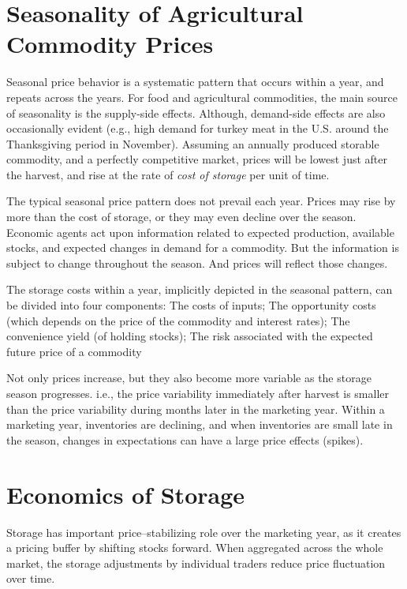 \documentclass[]{book}
\begin{document}
\section{Seasonality of Agricultural Commodity
Prices}\label{seasonality-of-agricultural-commodity-prices}

Seasonal price behavior is a systematic pattern that occurs within a
year, and repeats across the years. For food and agricultural
commodities, the main source of seasonality is the supply-side effects.
Although, demand-side effects are also occasionally evident (e.g., high
demand for turkey meat in the U.S. around the Thanksgiving period in
November). Assuming an annually produced storable commodity, and a
perfectly competitive market, prices will be lowest just after the
harvest, and rise at the rate of \emph{cost of storage} per unit of
time.

The typical seasonal price pattern does not prevail each year. Prices
may rise by more than the cost of storage, or they may even decline over
the season. Economic agents act upon information related to expected
production, available stocks, and expected changes in demand for a
commodity. But the information is subject to change throughout the
season. And prices will reflect those changes.

The storage costs within a year, implicitly depicted in the seasonal
pattern, can be divided into four components: The costs of inputs; The
opportunity costs (which depends on the price of the commodity and
interest rates); The convenience yield (of holding stocks); The risk
associated with the expected future price of a commodity

Not only prices increase, but they also become more variable as the
storage season progresses. i.e., the price variability immediately after
harvest is smaller than the price variability during months later in the
marketing year. Within a marketing year, inventories are declining, and
when inventories are small late in the season, changes in expectations
can have a large price effects (spikes).

\section{Economics of Storage}\label{economics-of-storage}

Storage has important price--stabilizing role over the marketing year,
as it creates a pricing buffer by shifting stocks forward. When
aggregated across the whole market, the storage adjustments by
individual traders reduce price fluctuation over time.
\end{document}
